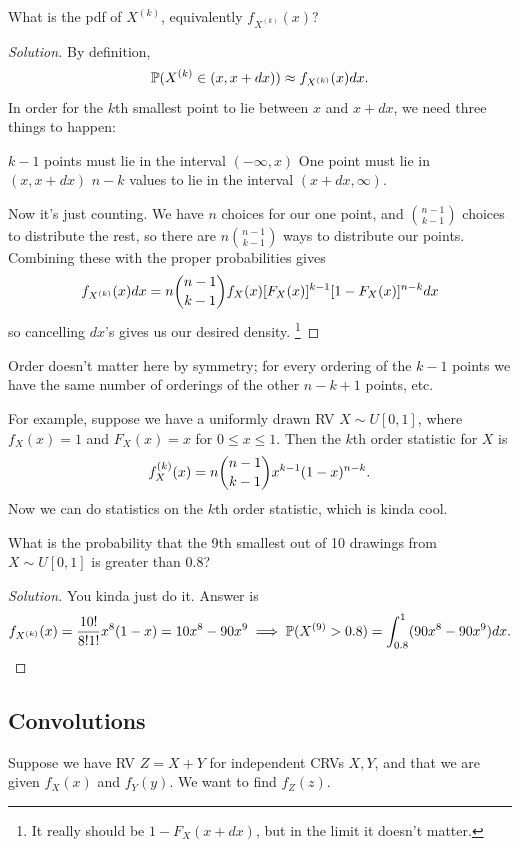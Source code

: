\documentclass[11 pt]{scrartcl}
\begin{document}
\begin{question}
    What is the pdf of $X^{(k)}$, equivalently $f_{X^{(k)}}(x)$?
\end{question}
\begin{proof}[Solution]
    By definition, 
    \[ \mathbb P(X^{(k)} \in (x, x+dx)) \approx f_{X^{(k)}}(x) dx.\] 
    In order for the $k$th smallest point to lie between $x$ and $x+dx$, we need three things to happen: 
    \begin{enumerate}
        \ii $k-1$ points must lie in the interval $(-\infty, x)$ 
        \ii One point must lie in $(x, x+dx)$ 
        \ii $n-k$ values to lie in the interval $(x+dx, \infty)$. 
    \end{enumerate}

    Now it's just counting. We have $n$ choices for our one point, and $\binom{n-1}{k-1}$ choices to distribute the rest, so there are $n\binom{n-1}{k-1}$ ways to distribute our points. Combining these with the proper probabilities gives 
    \[ f_{X^{(k)}}(x) dx = n \dbinom{n-1}{k-1} f_X(x) [F_X(x)]^{k-1}[1-F_X(x)]^{n-k}dx \]
    so cancelling $dx$'s gives us our desired density. \footnote{It really should be $1-F_X(x+dx)$, but in the limit it doesn't matter.}
\end{proof}

Order doesn't matter here by symmetry; for every ordering of the $k-1$ points we have the same number of orderings of the other $n-k+1$ points, etc. 

For example, suppose we have a uniformly drawn RV $X\sim U[0,1]$, where  $f_X(x) = 1$ and $F_X(x) = x$ for $0\leq x\leq 1$. Then the $k$th order statistic for $X$ is 
\[f_X^{(k)}(x) = n\dbinom{n-1}{k-1} x^{k-1}(1-x)^{n-k}.\] 
Now we can do statistics on the $k$th order statistic, which is kinda cool. 

\begin{question}
    What is the probability that the 9th smallest out of 10 drawings from $X\sim U[0,1]$ is greater than $0.8$? 
\end{question}
\begin{proof}[Solution]
    You kinda just do it. Answer is 
    \[ f_{X^{(k)}}(x) = \dfrac{10!}{8!1!} x^8(1-x) = 10x^8 -90x^9 \implies \mathbb P(X^{(9)} > 0.8) = \int_{0.8}^1 (90x^8 - 90x^9)dx.\] 
\end{proof}

\subsection{Convolutions}
Suppose we have RV $Z = X+Y$ for independent CRVs $X,Y$, and that we are given $f_X(x)$ and $f_Y(y)$. We want to find $f_Z(z)$. 
\end{document}
